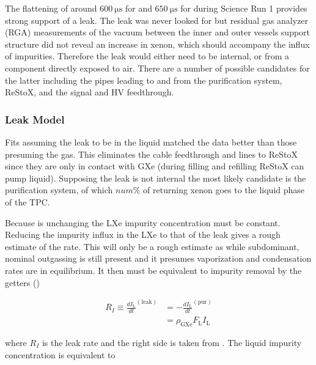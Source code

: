 The flattening of \te around $600\ \mathrm{\mu s}$ for \alphadecays and $650\ \mathrm{\mu s}$ for \metakr during Science Run 1 provides
strong support of a leak.  The leak was never looked for but residual gas analyzer (RGA) measurements of the vacuum between the inner and
outer vessels support structure did not reveal an increase in xenon, which should accompany the influx of impurities.  Therefore the
leak would either need to be internal, or from a component directly exposed to air.  There are a number of possible candidates for the
latter including the pipes leading to and from the purification system, ReStoX, and the signal and HV feedthrough.



\subsubsection{Leak Model}
\label{subsubsec:electron_lifetime_model_outgassing_leak_model}
Fits assuming the leak to be in the liquid matched the data better than those presuming the gas.  This eliminates the cable feedthrough
and lines to ReStoX since they are only in contact with GXe (during filling and refilling ReStoX can pump liquid).  Supposing the leak is
not internal the most likely candidate is the purification system, of which $num\%$ of returning xenon goes to the liquid phase of the
TPC.

Because \te is unchanging the LXe impurity concentration must be constant.  Reducing the impurity influx in the LXe to that of the leak
gives a rough estimate of the rate.  This will only be a rough estimate as while subdominant, nominal outgassing is still present and
it presumes vaporization and condensation rates are in equilibrium.  It then must be equivalent to impurity removal by the getters
()

\begin{equation}
\begin{aligned}
R_I \equiv \frac{dI_{\mathrm{L}}}{dt}^{(\mathrm{leak})} &= -\frac{dI_{\mathrm{L}}}{dt}^{(\mathrm{pur})}
\\
&= \rho_{\mathrm{GXe}} F_{\mathrm{L}} I_{\mathrm{L}}
\end{aligned}
\end{equation}

\noindent where $R_I$ is the leak rate and the right side is taken from .  The liquid
impurity concentration is equivalent to

